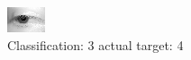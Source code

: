 \begin{figure}[h!]
\begin{center}
\includegraphics[width=0.60\columnwidth]{figures/ID2655_class_3_target_4.png}
\end{center}
\caption{ Classification: 3 actual target: 4}
\label{fig:ID2655_class_3_target_4}
\end{figure}
